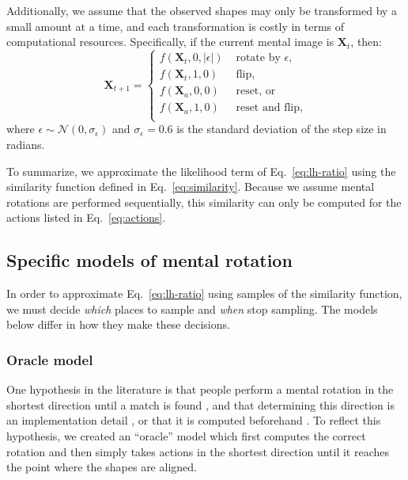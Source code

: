 \documentclass[10pt,letterpaper]{article}
\newcommand{\Xa}[0]{\mathbf{X}_a}
\newcommand{\Xt}[0]{\mathbf{X}_t}
\begin{document}
Additionally, we assume that the observed shapes may only be
transformed by a small amount at a time, and each transformation is
costly in terms of computational resources. Specifically, if the
current mental image is $\Xt$, then:
\begin{equation}
  \mathbf{X}_{t+1} = \left\{ \begin{array}{ll}
      f(\Xt, 0, |\epsilon|) &\mbox{ rotate by $\epsilon$,} \\
      f(\Xt, 1, 0) &\mbox{ flip,} \\
      f(\Xa, 0, 0) &\mbox{ reset, or} \\
      f(\Xa, 1, 0) &\mbox{ reset and flip,} \\
    \end{array} \right.
  \label{eq:actions}
\end{equation}
where $\epsilon\sim \mathcal{N}(0, \sigma_\epsilon)$ and
$\sigma_\epsilon=0.6$ is the standard deviation of the step size in
radians.

To summarize, we approximate the likelihood term of
Eq.~\ref{eq:lh-ratio} using the similarity function defined in
Eq.~\ref{eq:similarity}. Because we assume mental rotations are
performed sequentially, this similarity can only be computed for the
actions listed in Eq.~\ref{eq:actions}.

\subsection{Specific models of mental rotation}

In order to approximate Eq.~\ref{eq:lh-ratio} using samples of the
similarity function, we must decide \textit{which} places to sample
and \textit{when} stop sampling. The models below differ in how they
make these decisions.

\subsubsection{Oracle model}

One hypothesis in the literature is that people perform a mental
rotation in the shortest direction until a match is found
\cite{Shepard1971, Cooper:1975wp}, and that determining this direction
is an implementation detail \cite{Anderson1978}, or that it is
computed beforehand \cite{Funt:1983wn}.  To reflect this hypothesis,
we created an ``oracle'' model which first computes the correct
rotation and then simply takes actions in the shortest direction until
it reaches the point where the shapes are aligned.
\end{document}
